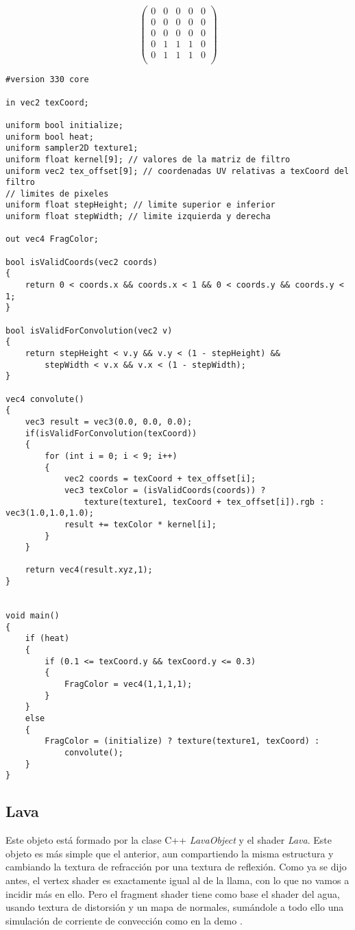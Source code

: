 \documentclass[12pt]{article}%
\begin{document}
\begin{equation}
	\begin{pmatrix}
		0 & 0 & 0 & 0 & 0 \\
		0 & 0 & 0 & 0 & 0 \\
		0 & 0 & 0 & 0 & 0 \\
		0 & 1 & 1 & 1 & 0 \\
		0 & 1 & 1 & 1 & 0 \\
	\end{pmatrix}
	\label{conv-matrix}
\end{equation}

\begin{lstlisting}[style=glsl]
#version 330 core

in vec2 texCoord;

uniform bool initialize;
uniform bool heat;
uniform sampler2D texture1;
uniform float kernel[9]; // valores de la matriz de filtro
uniform vec2 tex_offset[9]; // coordenadas UV relativas a texCoord del filtro
// limites de pixeles 
uniform float stepHeight; // limite superior e inferior
uniform float stepWidth; // limite izquierda y derecha

out vec4 FragColor;

bool isValidCoords(vec2 coords)
{
	return 0 < coords.x && coords.x < 1 && 0 < coords.y && coords.y < 1;
}

bool isValidForConvolution(vec2 v)
{
	return stepHeight < v.y && v.y < (1 - stepHeight) &&
		stepWidth < v.x && v.x < (1 - stepWidth);
}

vec4 convolute()
{
	vec3 result = vec3(0.0, 0.0, 0.0);
	if(isValidForConvolution(texCoord))
	{
		for (int i = 0; i < 9; i++)
		{
			vec2 coords = texCoord + tex_offset[i];
			vec3 texColor = (isValidCoords(coords)) ?
				texture(texture1, texCoord + tex_offset[i]).rgb : vec3(1.0,1.0,1.0);
			result += texColor * kernel[i];
		}
	}

	return vec4(result.xyz,1);
}


void main()
{
	if (heat)
	{
		if (0.1 <= texCoord.y && texCoord.y <= 0.3)
		{
			FragColor = vec4(1,1,1,1);
		}
	}
	else
	{
		FragColor = (initialize) ? texture(texture1, texCoord) :
			convolute();
	}
}
\end{lstlisting}
	
\subsection{Lava}

	Este objeto está formado por la clase C++ \textit{LavaObject} y el shader \textit{Lava}. Este objeto es más simple que el anterior, aun compartiendo la misma estructura y cambiando la textura de refracción por una textura de reflexión. Como ya se dijo antes, el vertex shader es exactamente igual al de la llama, con lo que no vamos a incidir más en ello. Pero el fragment shader tiene como base el shader del agua, usando textura de distorsión y un mapa de normales, sumándole a todo ello una simulación de corriente de convección como en la demo \cite{shader-lava}.
	
\end{document}
